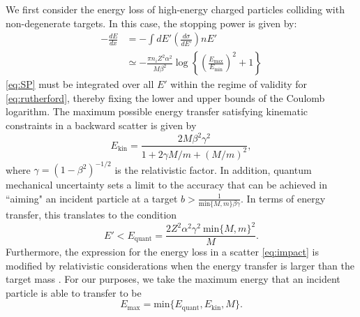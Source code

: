 \documentclass[twocolumn,showpacs,preprintnumbers,amsmath,amssymb,prd]{revtex4}
\def\r{\right)}
\def\l{\left(}
\begin{document}
\begin{appendices}
We first consider the energy loss of high-energy charged particles colliding with non-degenerate targets. In this case, the stopping power is given by:
\begin{align}
\label{eq:SP}
-\frac{dE}{dx} & = - \int dE' \left(\frac{d \sigma}{dE'}\right) n E' \\
& \simeq -\frac{\pi n_i Z^2 \alpha^2}{M \beta^2} \log\left\{{\l\frac{E_{\text{max}}}{E_{\text{min}}}\r}^2+1\right\}
\end{align}
\eqref{eq:SP} must be integrated over all $E'$ within the regime of validity for \eqref{eq:rutherford}, thereby fixing the lower and upper bounds of the Coulomb logarithm. The maximum possible energy transfer satisfying kinematic constraints in a backward scatter is given by
\begin{equation}
E_{\text{kin}} = \frac{2 M \beta^2 \gamma^2}{1+ 2\gamma M/m +(M/m)^2},
\end{equation}
where $\gamma = (1-\beta^2)^{-1/2}$ is the relativistic factor. In addition, quantum mechanical uncertainty sets a limit to the accuracy that can be achieved in ``aiming" an incident particle at a target $b > \frac{1}{\text{min}\{{M, m}\} \beta \gamma}$. In terms of energy transfer, this translates to the condition
\begin{equation}
E' < E_\text{quant} = \frac{2 Z^2 \alpha^2 \gamma^2 ~\text{min}\{{M, m}\}^2}{M}.
\end{equation}
Furthermore, the expression for the energy loss in a scatter \eqref{eq:impact} is modified by relativistic considerations when the energy transfer is larger than the target mass \cite{Rossi}. For our purposes, we take the maximum energy that an incident particle is able to transfer to be
\begin{equation}
E_{\text{max}} = \text{min}\{E_\text{quant}, E_{\text{kin}}, M\}.
\end{equation}


\end{appendices}
\end{document}
